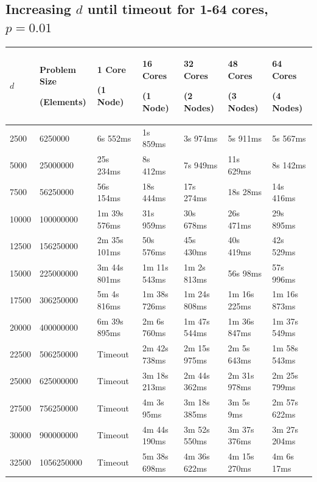 \documentclass[12pt]{article}
\begin{document}
\begin{appendices}
\vspace{-0.5cm}\subsection{Increasing $d$ until timeout for 1-64 cores, $p=0.01$}\vspace{-0.5cm}
\footnotesize{\label{sec:dtimeout}
\begin{center}
\begin{tabular}{|p{1cm}|p{2cm}|p{2.2cm}|p{2.2cm}|p{2.2cm}|p{2.2cm}|p{2.2cm}|}
\hline
$d$ & Problem Size\par (Elements) & 1 Core \par(1 Node) & 16 Cores \par(1 Node) & 32 Cores \par(2 Nodes) & 48 Cores \par(3 Nodes) & 64 Cores \par(4 Nodes) \\
\hline
2500 & 6250000 & 6s 552ms & 	1s 859ms & 	3s 974ms & 	5s 911ms & 	5s 567ms \\
5000 & 25000000 & 25s 234ms & 	8s 412ms & 	7s 949ms & 	11s 629ms & 	8s 142ms  \\ 
7500 & 56250000 & 56s 154ms & 	18s 444ms & 	17s 274ms & 	18s 28ms & 	14s 416ms  \\ 
10000 & 100000000 & 1m 39s 576ms & 	31s 959ms & 	30s 678ms & 	26s 471ms & 	29s 895ms  \\ 
12500 & 156250000 & 2m 35s 101ms & 	50s 576ms & 	45s 430ms & 	40s 419ms & 	42s 529ms  \\ 
15000 & 225000000 & 3m 44s 801ms & 	1m 11s 543ms & 	1m 2s 813ms & 	56s 98ms & 	57s 996ms  \\ 
17500 & 306250000 & 5m 4s 816ms & 	1m 38s 726ms & 	1m 24s 808ms & 	1m 16s 225ms & 	1m 16s 873ms  \\ 
20000 & 400000000 & 6m 39s 895ms & 	2m 6s 760ms & 	1m 47s 544ms & 	1m 36s 847ms & 	1m 37s 549ms  \\ 
22500 & 506250000 & Timeout &	2m 42s 738ms & 	2m 15s 975ms & 	2m 5s 643ms & 	1m 58s 543ms  \\ 
25000 & 625000000 & Timeout &	3m 18s 213ms & 	2m 44s 362ms & 	2m 31s 978ms & 	2m 25s 799ms  \\ 
27500 & 756250000 & Timeout &	4m 3s 95ms & 	3m 18s 385ms & 	3m 5s 9ms & 	2m 57s 622ms  \\ 
30000 & 900000000 & Timeout &	4m 44s 190ms & 	3m 52s 550ms & 	3m 37s 376ms & 	3m 27s 204ms  \\ 
32500 & 1056250000 & Timeout &	5m 38s 698ms & 	4m 36s 622ms & 	4m 15s 270ms & 	4m 6s 17ms  \\ 

\end{tabular}
\end{center}}
\end{appendices}
\end{document}
